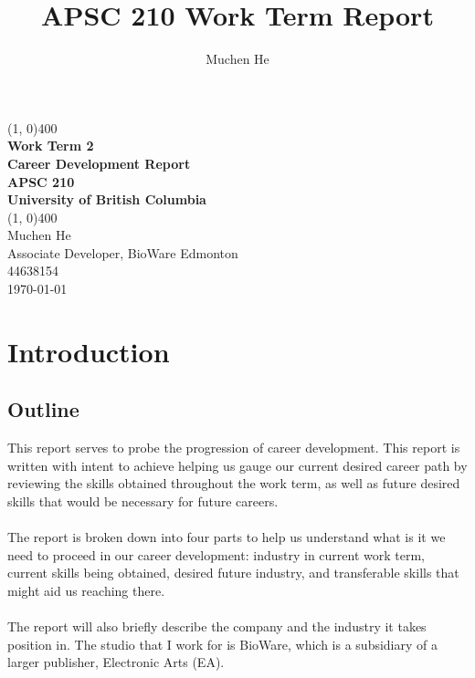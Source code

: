 \documentclass[10pt,letterpaper]{article}
\author{Muchen He}
\title{APSC 210 Work Term Report}
\begin{document}
\begin{titlepage}
\begin{center}
\vspace*{3in}
\line(1, 0){400}\\
\Huge{\textbf{Work Term 2}}\\[0.2cm]
\large{\textbf{Career Development Report}}\\[1cm]
\Large{\textbf{APSC 210}}\\
\textbf{University of British Columbia}\\
\line(1, 0){400}\\
\vfill
\Large{Muchen He}\\
\large{Associate Developer, BioWare Edmonton}\\
44638154\\

\today \\
\end{center}
\end{titlepage}

\setcounter{secnumdepth}{3}
\tableofcontents
\thispagestyle{empty}
\clearpage

\thispagestyle{empty}
\listoffigures 
\listoftables
\newpage

\setcounter{page}{1}
\setcounter{section}{-1}

\section{Introduction}\label{introduction}

\subsection{Outline}\label{introduction-outline}

This report serves to probe the progression of career development. This report is written with intent to achieve helping us gauge our current desired career path by reviewing the skills obtained throughout the work term, as well as future desired skills that would be necessary for future careers. \\
\\
The report is broken down into four parts to help us understand what is it we need to proceed in our career development: industry in current work term, current skills being obtained, desired future industry, and transferable skills that might aid us reaching there.\\
\\
The report will also briefly describe the company and the industry it takes position in. The studio that I work for is BioWare, which is a subsidiary of a larger publisher, Electronic Arts (EA).
\end{document}
